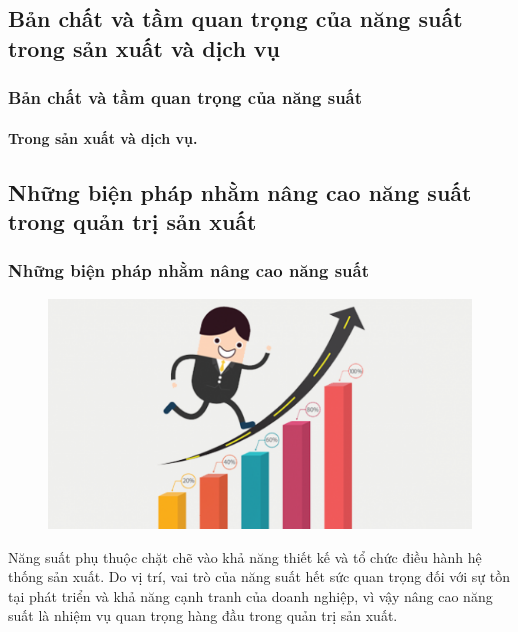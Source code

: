 \documentclass[10pt]{beamer}
\begin{document}
\subsection{Bản chất và tầm quan trọng của năng suất trong sản xuất và dịch vụ}
\begin{frame}
\transsplitverticalout
\frametitle{Bản chất và tầm quan trọng của năng suất}
\framesubtitle{Trong sản xuất và dịch vụ.}




\end{frame}

\subsection{Những biện pháp nhằm nâng cao năng suất trong quản trị sản xuất}
\begin{frame}
\transsplitverticalout
\frametitle{Những biện pháp nhằm nâng cao năng suất}
\begin{figure}
\includegraphics[scale=0.3]{Figs/nangcao}
\end{figure}
Năng suất phụ thuộc chặt chẽ vào khả năng thiết kế và tổ chức điều hành hệ thống sản
xuất. Do vị trí, vai trò của năng suất hết sức quan trọng đối với sự tồn tại phát triển và
khả năng cạnh tranh của doanh nghiệp, vì vậy nâng cao năng suất là nhiệm vụ quan
trọng hàng đầu trong quản trị sản xuất. 


\end{frame}
\end{document}
